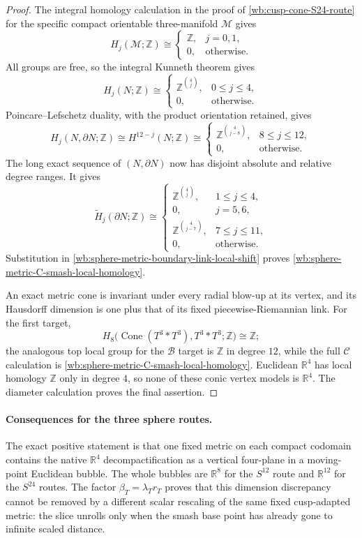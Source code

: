 \begin{proof}
The integral homology calculation in the proof of
\cref{wb:cusp-cone-S24-route} for the specific compact orientable
three-manifold \(\mathcal M\) gives
\[
 H_j(\mathcal M;\mathbb Z)\cong
 \begin{cases}
  \mathbb Z,&j=0,1,\\
  0,&\text{otherwise}.
 \end{cases}
\]
All groups are free, so the integral Kunneth theorem gives
\[
 H_j(N;\mathbb Z)\cong
 \begin{cases}
  \mathbb Z^{\binom4j},&0\leq j\leq4,\\
  0,&\text{otherwise}.
 \end{cases}
\]
Poincare--Lefschetz duality, with the product orientation retained, gives
\[
 H_j(N,\partial N;\mathbb Z)
 \cong H^{12-j}(N;\mathbb Z)
 \cong
 \begin{cases}
  \mathbb Z^{\binom4{j-8}},&8\leq j\leq12,\\
  0,&\text{otherwise}.
 \end{cases}
\]
The long exact sequence of \((N,\partial N)\) now has disjoint absolute
and relative degree ranges.  It gives
\[
 \widetilde H_j(\partial N;\mathbb Z)\cong
 \begin{cases}
  \mathbb Z^{\binom4j},&1\leq j\leq4,\\
  0,&j=5,6,\\
  \mathbb Z^{\binom4{j-7}},&7\leq j\leq11,\\
  0,&\text{otherwise}.
 \end{cases}
\]
Substitution in
\eqref{wb:sphere-metric-boundary-link-local-shift} proves
\eqref{wb:sphere-metric-C-smash-local-homology}.

An exact metric cone is invariant under every radial blow-up at its vertex,
and its Hausdorff dimension is one plus that of its fixed
piecewise-Riemannian link.  For the first target,
\[
 H_8\bigl(\operatorname{Cone}(T^3*T^3),T^3*T^3;\mathbb Z\bigr)
 \cong\mathbb Z;
\]
the analogous top local group for the \(\mathcal B\) target is
\(\mathbb Z\) in degree \(12\), while the full \(\mathcal C\) calculation
is \eqref{wb:sphere-metric-C-smash-local-homology}.  Euclidean
\(\mathbb R^4\) has local homology \(\mathbb Z\) only in degree \(4\), so
none of these conic vertex models is \(\mathbb R^4\).  The diameter
calculation proves the final assertion.
\end{proof}

\paragraph{Consequences for the three sphere routes.}
The exact positive statement is that one fixed metric on each compact
codomain contains the native \(\mathbb R^4\) decompactification as a
vertical four-plane in a moving-point Euclidean bubble.  The whole bubbles
are \(\mathbb R^8\) for the \(S^{12}\) route and \(\mathbb R^{12}\) for the
\(S^{24}\) routes.  The factor \(\beta_T=\lambda_Tr_T\) proves that this
dimension discrepancy cannot be removed by a different scalar rescaling
of the same fixed cusp-adapted metric: the slice unrolls only when the
smash base point has already gone to infinite scaled distance.

